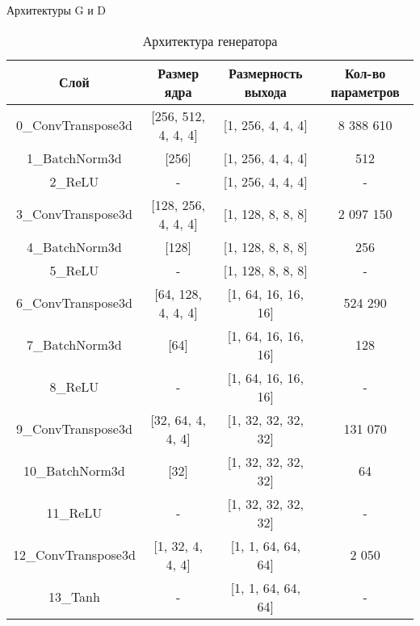 \documentclass[12pt]{beamer}
\begin{document}
	\begin{frame}{Архитектуры G и D}
		\begin{table}[h]
			\tabcolsep=0.11cm
			\scriptsize
			\centering
			\begin{tabular}{|c|c|c|c|}
				\hline
				Слой & Размер ядра & Размерность выхода & Кол-во параметров \\
				\hline
				0\_ConvTranspose3d &  [256, 512, 4, 4, 4] & [1, 256, 4, 4, 4] & 8 388 610 \\
				1\_BatchNorm3d &  [256] & [1, 256, 4, 4, 4] & 512 \\
				2\_ReLU & - & [1, 256, 4, 4, 4] & - \\
				\hline
				3\_ConvTranspose3d &  [128, 256, 4, 4, 4] & [1, 128, 8, 8, 8] & 2 097 150 \\
				4\_BatchNorm3d &  [128] & [1, 128, 8, 8, 8] & 256 \\
				5\_ReLU & - & [1, 128, 8, 8, 8] & - \\
				\hline
				6\_ConvTranspose3d &  [64, 128, 4, 4, 4] & [1, 64, 16, 16, 16] & 524 290 \\
				7\_BatchNorm3d &  [64] & [1, 64, 16, 16, 16] & 128 \\
				8\_ReLU & - & [1, 64, 16, 16, 16] & - \\
				\hline
				9\_ConvTranspose3d &  [32, 64, 4, 4, 4] & [1, 32, 32, 32, 32] & 131 070 \\
				10\_BatchNorm3d &  [32] & [1, 32, 32, 32, 32] & 64 \\
				11\_ReLU & - & [1, 32, 32, 32, 32] & - \\
				\hline
				12\_ConvTranspose3d &  [1, 32, 4, 4, 4] & [1, 1, 64, 64, 64] & 2 050 \\
				13\_Tanh & - & [1, 1, 64, 64, 64] & - \\
				\hline
			\end{tabular}
			\caption{Архитектура генератора}
			\label{5-g-arch}
		\end{table}
	\end{frame}
	
\end{document}
